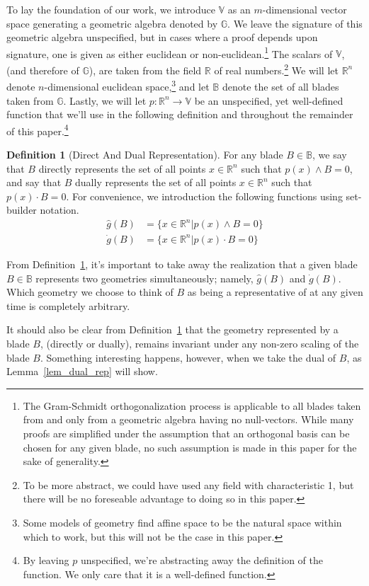 \documentclass{birkjour}
\theoremstyle{definition}
\newtheorem{defn}[thm]{Definition}
\theoremstyle{remark}
\numberwithin{equation}{section}
\newcommand{\R}{\mathbb{R}}
\newcommand{\B}{\mathbb{B}}
\newcommand{\G}{\mathbb{G}}
\newcommand{\V}{\mathbb{V}}
\newcommand{\gd}{\dot{g}}
\newcommand{\gh}{\hat{g}}
\begin{document}
To lay the foundation of our work, we introduce $\V$ as an $m$-dimensional vector
space generating a geometric algebra denoted by $\G$.  We leave the signature of this geometric algebra
unspecified, but in cases where a proof depends upon signature, one is given as either
euclidean or non-euclidean.\footnote{The Gram-Schmidt orthogonalization process is applicable
to all blades taken from and only from a geometric algebra having no null-vectors.  While many proofs
are simplified under the assumption that an orthogonal basis can be chosen for any given blade, no such
assumption is made in this paper for the sake of generality.}
The scalars of $\V$, (and therefore of $\G$), are taken from the field $\R$ of real numbers.\footnote{To be more abstract,
we could have used any field with characteristic 1, but there will be no foreseable advantage to doing so in this paper.}
We will let $\R^n$ denote $n$-dimensional euclidean space,\footnote{Some models of geometry find affine space to be the natural
space within which to work, but this will not be the case in this paper.} and let $\B$ denote the set of all blades taken from $\G$.
Lastly, we will let $p:\R^n\to\V$ be an unspecified, yet well-defined function that we'll use in the following definition and
throughout the remainder of this paper.\footnote{By leaving $p$ unspecified, we're abstracting away the definition of the function.
We only care that it is a well-defined function.}

\begin{defn}[Direct And Dual Representation]\label{def_blade_rep_geo}
For any blade $B\in\B$, we say that $B$ directly represents the set of all points $x\in\R^n$ such that
$p(x)\wedge B=0$, and say that $B$ dually represents the set of all points $x\in\R^n$ such that
$p(x)\cdot B=0$.  For convenience, we introduction the following functions using set-builder notation.
\begin{align*}
\gh(B) &= \{x\in\R^n|p(x)\wedge B=0\} \\
\gd(B) &= \{x\in\R^n|p(x)\cdot B=0\}
\end{align*}
\end{defn}
From Definition~\ref{def_blade_rep_geo}, it's important to take away the realization that a given blade $B\in\B$ represents two geometries
simultaneously; namely, $\gh(B)$ and $\gd(B)$.  Which geometry we choose to think of $B$ as being a representative of at any given time is completely
arbitrary.

It should also be clear from Definition~\ref{def_blade_rep_geo} that the geometry represented by a blade $B$, (directly or dually), remains invariant
under any non-zero scaling of the blade $B$.  Something interesting happens, however, when we take the dual of $B$, as Lemma~\ref{lem_dual_rep} will show.
\end{document}

